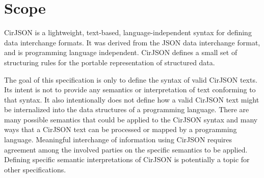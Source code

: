 
\section{Scope}

CirJSON is a lightweight, text-based, language-independent syntax for defining data interchange formats.
It was derived from the JSON data interchange format, and is programming language independent.
CirJSON defines a small set of structuring rules for the portable representation of structured data.

The goal of this specification is only to define the syntax of valid CirJSON texts.
Its intent is not to provide any semantics or interpretation of text conforming to that syntax.
It also intentionally does not define how a valid CirJSON text might be internalized into the data structures of a programming language.
There are many possible semantics that could be applied to the CirJSON syntax and many ways that a CirJSON text can be processed or
mapped by a programming language.
Meaningful interchange of information using CirJSON requires agreement among the involved parties on the specific semantics to be applied.
Defining specific semantic interpretations of CirJSON is potentially a topic for other specifications.
